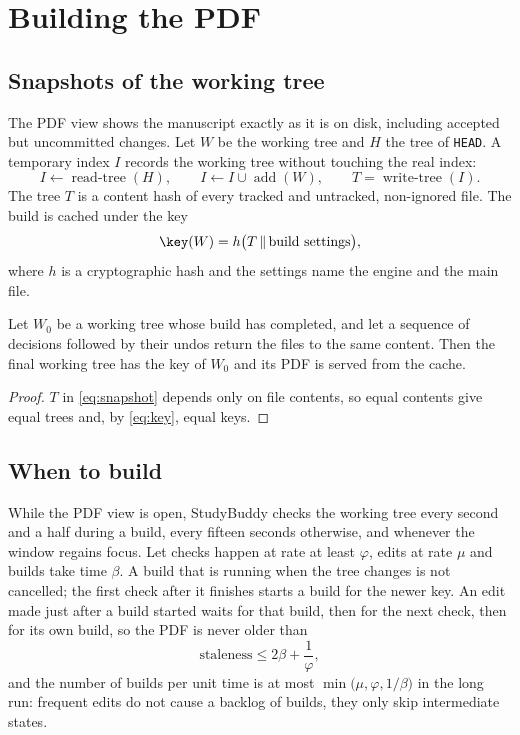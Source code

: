 \section{Building the PDF}
\label{sec:build}

\subsection{Snapshots of the working tree}

The PDF view shows the manuscript exactly as it is on disk, including accepted
but uncommitted changes. Let $W$ be the working tree and $H$ the tree of
\texttt{HEAD}. A temporary index $I$ records the working tree without touching
the real index:
\begin{equation}
  I \leftarrow \operatorname{read-tree}(H), \qquad
  I \leftarrow I \cup \operatorname{add}(W), \qquad
  T = \operatorname{write-tree}(I) .
  \label{eq:snapshot}
\end{equation}
The tree $T$ is a content hash of every tracked and untracked, non-ignored
file. The build is cached under the key
\begin{equation}
  \key(W) = h\bigl(T \,\|\, \text{build settings}\bigr),
  \label{eq:key}
\end{equation}
where $h$ is a cryptographic hash and the settings name the engine and the
main file.

\begin{proposition}
\label{prop:undo-build}
Let $W_0$ be a working tree whose build has completed, and let a sequence of
decisions followed by their undos return the files to the same content. Then
the final working tree has the key of $W_0$ and its PDF is served from the
cache.
\end{proposition}

\begin{proof}
$T$ in \cref{eq:snapshot} depends only on file contents, so equal contents give
equal trees and, by \cref{eq:key}, equal keys.
\end{proof}

\subsection{When to build}

While the PDF view is open, StudyBuddy checks the working tree every second and
a half during a build, every fifteen seconds otherwise, and whenever the window
regains focus. Let checks happen at rate at least $\varphi$, edits at rate
$\mu$ and builds take time $\beta$. A build that is running when the tree
changes is not cancelled; the first check after it finishes starts a build for
the newer key. An edit made just after a build started waits for that build,
then for the next check, then for its own build, so the PDF is never older than
\begin{equation}
  \text{staleness} \le 2\beta + \frac{1}{\varphi} ,
  \label{eq:staleness}
\end{equation}
and the number of builds per unit time is at most
$\min\bigl(\mu, \varphi, 1/\beta\bigr)$ in the long run: frequent edits do not
cause a backlog of builds, they only skip intermediate states.

